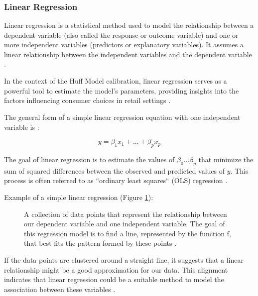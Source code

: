 \subsubsection{Linear Regression}

Linear regression is a statistical method used to model the relationship between a dependent variable (also called the response or outcome variable) and one or more independent variables (predictors or explanatory variables). It assumes a linear relationship between the independent variables and the dependent variable \cite{gross2003linear}. 

In the context of the Huff Model calibration, linear regression serves as a powerful tool to estimate the model's parameters, providing insights into the factors influencing consumer choices in retail settings \cite{huff2008calibrating}.

The general form of a simple linear regression equation with one independent variable is \cite{gross2003linear}:

\begin{equation}
y = \beta_1 x_1 + ... + \beta_p x_p
\label{eq:linear-regression}
\end{equation}

The goal of linear regression is to estimate the values of $\beta_0 ... \beta_p$ that minimize the sum of squared differences between the observed and predicted values of $y$. This process is often referred to as ``ordinary least squares`` (OLS) regression \cite{gross2003linear}.

Example of a simple linear regression (Figure \ref{fig:linear-regression}):

\begin{figure}[hbt]
	\centering
	
	\caption{A collection of data points that represent the relationship between our dependent variable and one independent variable. The goal of this regression model is to find a line, represented by the function f, that best fits the pattern formed by these points \cite{gross2003linear}.}
	\label{fig:linear-regression}
\end{figure}

If the data points are clustered around a straight line, it suggests that a linear relationship might be a good approximation for our data. This alignment indicates that linear regression could be a suitable method to model the association between these variables \cite{gross2003linear}.


